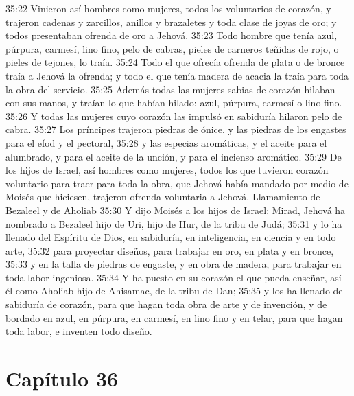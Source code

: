 35:22 Vinieron así hombres como mujeres, todos los voluntarios de corazón, y trajeron cadenas y zarcillos, anillos y brazaletes y toda clase de joyas de oro; y todos presentaban ofrenda de oro a Jehová. 
35:23 Todo hombre que tenía azul, púrpura, carmesí, lino fino, pelo de cabras, pieles de carneros teñidas de rojo, o pieles de tejones, lo traía. 
35:24 Todo el que ofrecía ofrenda de plata o de bronce traía a Jehová la ofrenda; y todo el que tenía madera de acacia la traía para toda la obra del servicio. 
35:25 Además todas las mujeres sabias de corazón hilaban con sus manos, y traían lo que habían hilado: azul, púrpura, carmesí o lino fino. 
35:26 Y todas las mujeres cuyo corazón las impulsó en sabiduría hilaron pelo de cabra. 
35:27 Los príncipes trajeron piedras de ónice, y las piedras de los engastes para el efod y el pectoral, 
35:28 y las especias aromáticas, y el aceite para el alumbrado, y para el aceite de la unción, y para el incienso aromático. 
35:29 De los hijos de Israel, así hombres como mujeres, todos los que tuvieron corazón voluntario para traer para toda la obra, que Jehová había mandado por medio de Moisés que hiciesen, trajeron ofrenda voluntaria a Jehová. 
Llamamiento de Bezaleel y de Aholiab 
35:30 Y dijo Moisés a los hijos de Israel: Mirad, Jehová ha nombrado a Bezaleel hijo de Uri, hijo de Hur, de la tribu de Judá; 
35:31 y lo ha llenado del Espíritu de Dios, en sabiduría, en inteligencia, en ciencia y en todo arte, 
35:32 para proyectar diseños, para trabajar en oro, en plata y en bronce, 
35:33 y en la talla de piedras de engaste, y en obra de madera, para trabajar en toda labor ingeniosa. 
35:34 Y ha puesto en su corazón el que pueda enseñar, así él como Aholiab hijo de Ahisamac, de la tribu de Dan; 
35:35 y los ha llenado de sabiduría de corazón, para que hagan toda obra de arte y de invención, y de bordado en azul, en púrpura, en carmesí, en lino fino y en telar, para que hagan toda labor, e inventen todo diseño. 
\section*{Capítulo 36}

